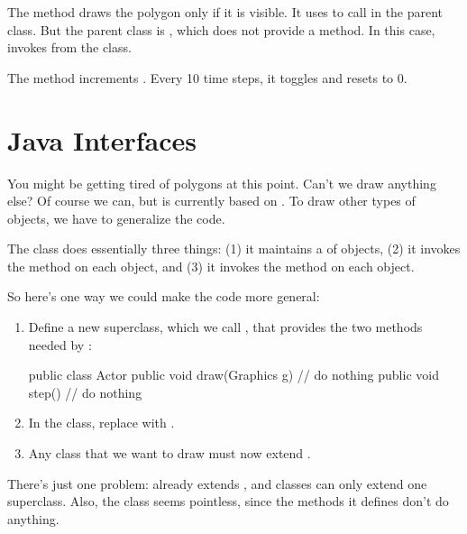 The  method draws the polygon only if it is visible.
It uses  to call  in the parent class.
But the parent class is , which does not provide a  method.
In this case,  invokes  from the  class.

The  method increments .
Every 10 time steps, it toggles  and resets  to 0.


\section{Java Interfaces}

You might be getting tired of polygons at this point.
Can't we draw anything else?
Of course we can, but  is currently based on .
To draw other types of objects, we have to generalize the code.

The  class does essentially three things: (1) it maintains a  of objects, (2) it invokes the  method on each object, and (3) it invokes the  method on each object.

So here's one way we could make the code more general:

\begin{enumerate}

\item Define a new superclass, which we call , that provides the two methods needed by :

\begin{code}
public class Actor {
    public void draw(Graphics g) {
        // do nothing
    }
    public void step() {
        // do nothing
    }
}
\end{code}

\item In the  class, replace  with .

\item Any class that we want to draw must now extend .

\end{enumerate}

There's just one problem:  already extends , and classes can only extend one superclass.
Also, the  class seems pointless, since the methods it defines don't do anything.

